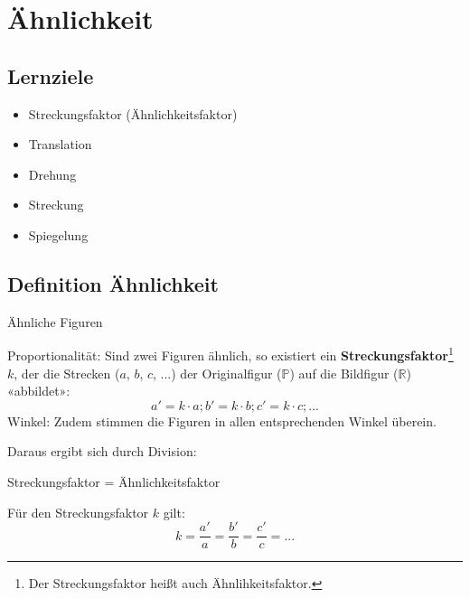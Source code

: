 
\section{Ähnlichkeit}

\subsection*{Lernziele}

\begin{itemize}
\item Streckungsfaktor (Ähnlichkeitsfaktor)
\item Translation
\item Drehung
\item Streckung
\item Spiegelung
\end{itemize}

\newpage


\subsection{Definition Ähnlichkeit}



\begin{definition}{Ähnliche Figuren}{}
  
Proportionalität: Sind zwei Figuren ähnlich, so existiert ein
\textbf{Streckungsfaktor}\footnote{Der
  Streckungsfaktor heißt auch Ähnlihkeitsfaktor.}
$k$, der die Strecken ($a$, $b$, $c$, ...) der Originalfigur
($\mathbb{P}$) auf die Bildfigur ($\mathbb{R}$) «abbildet»:
$$a' = k\cdot{}a; b' = k\cdot{}b; c' = k\cdot{} c; ...$$
Winkel: Zudem stimmen die Figuren in allen entsprechenden Winkel überein.
\end{definition}

Daraus ergibt sich durch Division:
\begin{gesetz}{Streckungsfaktor
    = Ähnlichkeitsfaktor}{}

  Für den Streckungsfaktor $k$ gilt:
  $$k = \frac{a'}{a} = \frac{b'}{b} = \frac{c'}{c} = ...$$
\end{gesetz}

